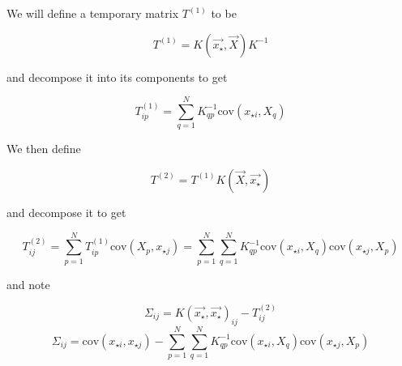 \documentclass[phd,tocprelim]{cornell}
\begin{document}
We will define a temporary matrix $T^{(1)}$ to be

\begin{equation}
 T^{(1)} = K(\vec{x_{\star}}, \vec{X}) K^{-1}
\end{equation}

and decompose it into its components to get

\begin{equation}
 T^{(1)}_{ip} = \sum_{q = 1}^{N} K^{-1}_{qp} \mbox{cov}(x_{\star i}, X_{q})
\end{equation}

We then define

\begin{equation}
 T^{(2)} = T^{(1)} K(\vec{X}, \vec{x_{\star}})
\end{equation}

and decompose it to get

\begin{equation}
 T^{(2)}_{ij} = \sum_{p = 1}^{N} T^{(1)}_{ip} \mbox{cov}(X_{p}, x_{\star j}) = \sum_{p = 1}^{N} \sum_{q = 1}^{N} K^{-1}_{qp} \mbox{cov}(x_{\star i}, X_{q}) \mbox{cov}(x_{\star j}, X_{p})
\end{equation}

and note

\begin{equation}
 \Sigma_{ij} = K(\vec{x_{\star}}, \vec{x_{\star}})_{ij} - T^{(2)}_{ij}
\end{equation}
\begin{equation}
 \Sigma_{ij} = \mbox{cov}(x_{\star i}, x_{\star j}) - \sum_{p = 1}^{N} \sum_{q = 1}^{N} K^{-1}_{qp} \mbox{cov}(x_{\star i}, X_{q}) \mbox{cov}(x_{\star j}, X_{p})
\end{equation}
\end{document}
